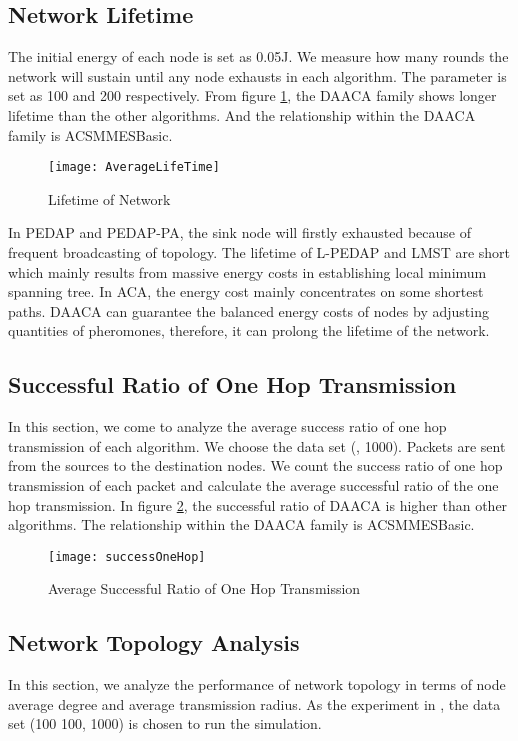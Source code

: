 \documentclass{elsarticle}
\begin{document}
\subsection{Network Lifetime} \label{NetworkLifetime}
The initial energy of each node is set as 0.05J. We measure how many rounds the network will sustain until any node exhausts in each algorithm. The parameter  is set as 100 and 200 respectively. From figure \ref{figure7}, the DAACA family shows longer lifetime than the other algorithms. And the relationship within the DAACA family is ACSMMESBasic.
\begin{figure}
\centering
\texttt{[image: AverageLifeTime]}\\
  \caption{Lifetime of Network}\label{figure7}
\end{figure}
In PEDAP and PEDAP-PA, the sink node will firstly exhausted because of frequent broadcasting of topology. The lifetime of L-PEDAP and LMST are short which mainly results from massive energy costs in establishing local minimum spanning tree. In ACA, the energy cost mainly concentrates on some shortest paths. DAACA can guarantee the balanced energy costs of nodes by adjusting quantities of pheromones, therefore, it can prolong the lifetime of the network.

\subsection{Successful Ratio of One Hop Transmission}
In this section, we come to analyze the average success ratio of one hop transmission of each algorithm. We choose the data set (, 1000). Packets are sent from the sources to the destination nodes. We count the success ratio of one hop transmission of each packet and calculate the average successful ratio of the one hop transmission. In figure \ref{fig:success}, the successful ratio of DAACA is higher than other algorithms. The relationship within the DAACA family is ACSMMESBasic.

\begin{figure}
  \centering \texttt{[image: successOneHop]}\\
  \caption{Average Successful Ratio of One Hop Transmission}\label{fig:success}
\end{figure}



\subsection{Network Topology Analysis} \label{NetworkTopologyAnalysis}
In this section, we analyze the performance of network topology in terms of node average degree and average transmission radius. As the experiment in \cite{label-7}, the data set (100  100, 1000) is chosen to run the simulation.
\end{document}
